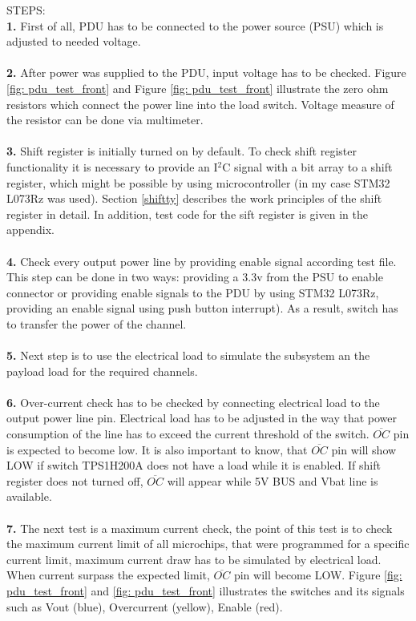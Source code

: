 STEPS:\\
\textbf{1.}  First of all, PDU has to be connected to the power source (PSU) which is adjusted to needed voltage.\\ \\
\textbf{2.} After power was supplied to the PDU, input voltage has to be checked. Figure \ref{fig: pdu_test_front} and Figure \ref{fig: pdu_test_front} illustrate the zero ohm resistors which connect the power line into the load switch. Voltage measure of the resistor can be done via multimeter. \\ \\
\textbf{3.} Shift register is initially turned on by default. To check shift register functionality it is necessary to provide an I$^2$C signal with a bit array to a shift register, which might be possible by using microcontroller (in my case STM32 L073Rz was used). Section \ref{shiftty} describes the work principles of the shift register in detail. In addition, test code for the sift register is given in the appendix. \\ \\
\textbf{4.} Check every output power line by providing enable signal according test file. This step can be done in two ways: providing a 3.3v from the PSU to enable connector or providing
enable signals to the PDU by using STM32 L073Rz, providing an enable signal using push button interrupt). As a result, switch has to transfer the power of the channel.\\ \\
\textbf{5.} Next step is to use the electrical load to simulate the subsystem an the payload load for the required channels.\\ \\
\textbf{6.} Over-current check has to be checked by connecting electrical load to the output power line
pin. Electrical load has to be adjusted in the way that power consumption of the line has to exceed the current
threshold of the switch. $\overline{OC}$ pin is expected to become low.
It is also important to know, that $\overline{OC}$ pin will show LOW if switch TPS1H200A does not have a load while it is enabled. If shift register does not turned off, $\overline{OC}$ will appear while 5V BUS and Vbat line is available.\\ \\
\textbf{7.} The next test is a maximum current check, the point of this test is to check the maximum current limit of all microchips, that were programmed for a
specific current limit, maximum current draw has to be simulated by electrical load. When current surpass the expected
limit, $\overline{OC}$ pin will become LOW.
Figure \ref{fig: pdu_test_front} and \ref{fig: pdu_test_front} illustrates the switches and its signals such as Vout (blue), Overcurrent (yellow), Enable (red).

